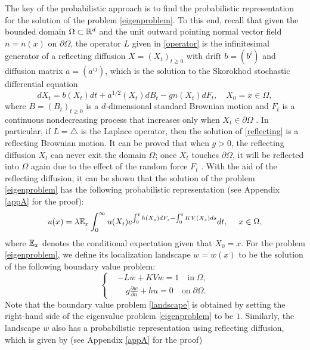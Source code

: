 \documentclass[a4paper,11pt]{article}
\begin{document}
The key of the probabilistic approach is to find the probabilistic representation for the solution of the problem \eqref{eigenproblem}. To this end, recall that given the bounded domain $\Omega \subset \mathbb{R}^d$ and the unit outward pointing normal vector field $n = n(x)$ on $\partial \Omega$, the operator $L$ given in \eqref{operator} is the infinitesimal generator of a reflecting diffusion $X = (X_t)_{t \geq 0}$ with drift $b = (b^i)$ and diffusion matrix $a = (a^{ij})$, which is the solution to the Skorokhod stochastic differential equation
\begin{equation}\label{reflecting}
dX_t = b(X_t) dt + a^{1/2}(X_t) d B_t - g n(X_t) d F_t, \quad X_0 = x\in\Omega,
\end{equation}
where $B = (B_t)_{t\geq 0}$ is a $d$-dimensional standard Brownian motion and $F_t$ is a continuous nondecreasing process that increases only when $X_t \in \partial \Omega$ \cite{1998Diffusions}. In particular, if $L = \triangle$ is the Laplace operator, then the solution of \eqref{reflecting} is a reflecting Brownian motion. It can be proved that when $g > 0$, the reflecting diffusion $X_t$ can never exit the domain $\Omega$; once $X_t$ touches $\partial \Omega$, it will be reflected into $\Omega$ again due to the effect of the random force $F_t$ \cite{1998Diffusions}. With the aid of the reflecting diffusion, it can be shown that the solution of the problem \eqref{eigenproblem} has the following probabilistic representation (see Appendix \ref{appA} for the proof):
\begin{equation}\label{probeigen}
u(x) = \lambda \mathbb{E}_x \int_{0}^{\infty} u(X_t) e^{\int_{0}^{t} h(X_s) d F_s - \int_{0}^{t} K V(X_s) ds} dt, \quad \; x \in \Omega,
\end{equation}
where $\mathbb{E}_x$ denotes the conditional expectation given that $X_0 = x$. For the problem \eqref{eigenproblem}, we define its localization landscape $w = w(x)$ to be the solution of the following boundary value problem:
\begin{equation}\label{landscape}
\left\{
\begin{split}
& - L w + K V w = 1 \quad \textrm{in} \; \Omega, \\
& \quad g \frac{\partial w}{\partial n} + h u = 0 \quad \textrm{on} \; \partial \Omega.
\end{split}
\right.
\end{equation}
Note that the boundary value problem \eqref{landscape} is obtained by setting the right-hand side of the eigenvalue problem \eqref{eigenproblem} to be $1$. Similarly, the landscape $w$ also has a probabilistic representation using reflecting diffusion, which is given by (see Appendix \ref{appA} for the proof)
\end{document}

